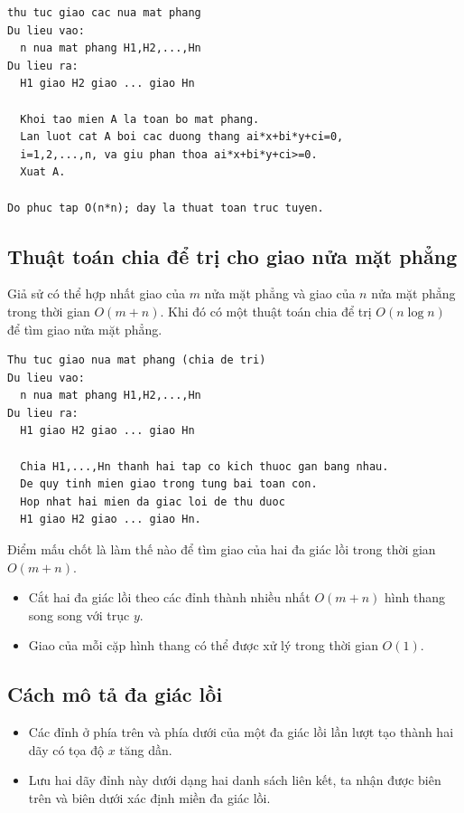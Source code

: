 \documentclass[11pt]{article}
\begin{document}
\begin{verbatim}
thu tuc giao cac nua mat phang
Du lieu vao:
  n nua mat phang H1,H2,...,Hn
Du lieu ra:
  H1 giao H2 giao ... giao Hn

  Khoi tao mien A la toan bo mat phang.
  Lan luot cat A boi cac duong thang ai*x+bi*y+ci=0,
  i=1,2,...,n, va giu phan thoa ai*x+bi*y+ci>=0.
  Xuat A.

Do phuc tap O(n*n); day la thuat toan truc tuyen.
\end{verbatim}

\subsection*{Thuật toán chia để trị cho giao nửa mặt phẳng}

Giả sử có thể hợp nhất giao của \(m\) nửa mặt phẳng và giao của \(n\) nửa
mặt phẳng trong thời gian \(O(m+n)\). Khi đó có một thuật toán chia để trị
\(O(n\log n)\) để tìm giao nửa mặt phẳng.

\begin{verbatim}
Thu tuc giao nua mat phang (chia de tri)
Du lieu vao:
  n nua mat phang H1,H2,...,Hn
Du lieu ra:
  H1 giao H2 giao ... giao Hn

  Chia H1,...,Hn thanh hai tap co kich thuoc gan bang nhau.
  De quy tinh mien giao trong tung bai toan con.
  Hop nhat hai mien da giac loi de thu duoc
  H1 giao H2 giao ... giao Hn.
\end{verbatim}

Điểm mấu chốt là làm thế nào để tìm giao của hai đa giác lồi trong thời gian
\(O(m+n)\).

\begin{itemize}
  \item Cắt hai đa giác lồi theo các đỉnh thành nhiều nhất \(O(m+n)\) hình
  thang song song với trục \(y\).
  \item Giao của mỗi cặp hình thang có thể được xử lý trong thời gian
  \(O(1)\).
\end{itemize}

\subsection*{Cách mô tả đa giác lồi}

\begin{itemize}
  \item Các đỉnh ở phía trên và phía dưới của một đa giác lồi lần lượt tạo
  thành hai dãy có tọa độ \(x\) tăng dần.
  \item Lưu hai dãy đỉnh này dưới dạng hai danh sách liên kết, ta nhận được
  biên trên và biên dưới xác định miền đa giác lồi.
\end{itemize}
\end{document}
